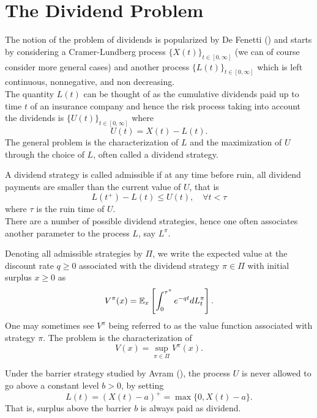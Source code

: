 \section{The Dividend Problem}

The notion of the problem of dividends is popularized by De Fenetti (\cite{deF}) and starts by considering a Cramer-Lundberg process $\{ X(t) \}_{t \in [0,\infty] }$ (we can of course consider more general cases) and another process $\{ L(t) \}_{t \in [0,\infty] }$ which is left continuous, nonnegative, and non decreasing.\\
\bigskip
The quantity $L(t)$ can be thought of as the cumulative dividends paid up to time $t$ of an insurance company and hence the risk process taking into account the dividends is $\{ U(t) \}_{t \in [0,\infty] }$ where
\[
U(t) = X(t) - L(t).
\]
The general problem is the characterization of $L$ and the maximization of $U$ through the choice of $L$, often called a dividend strategy.

A dividend strategy is called admissible if at any time before ruin, all dividend payments are smaller than the current value of $U$, that is
\[L(t^+) - L(t) \leq U(t), \quad \forall t < \tau\]
where $\tau$ is the ruin time of $U$.\\
\bigskip
There are a number of possible dividend strategies, hence one often associates another parameter to the process $L$, say $L^{\pi}$.

Denoting all admissible strategies by $\Pi$, we write the expected value at the discount rate $q\geq 0$ associated with the dividend strategy $\pi \in \Pi$ with initial surplus $x \geq 0$ as
\[
V^{\pi}(x) = \mathbb{E}_x \left[ \int_0^{\tau^{\pi}} e^{-qt} dL^{\pi}_t \right].
\]
One may sometimes see $V^{\pi}$ being referred to as the value function associated with strategy $\pi$. The problem is the characterization of
\[
V(x) = \sup_{\pi \in \Pi} V^{\pi}(x).
\]

Under the barrier strategy studied by Avram (\cite{APP}), the  process $U$ is never allowed to go above a constant level $b>0$, by setting
\[ L(t) = (X(t)-a)^+ = \max \{0, X(t)-a\}. \]
That is, surplus above the barrier $b$ is always paid as dividend.

